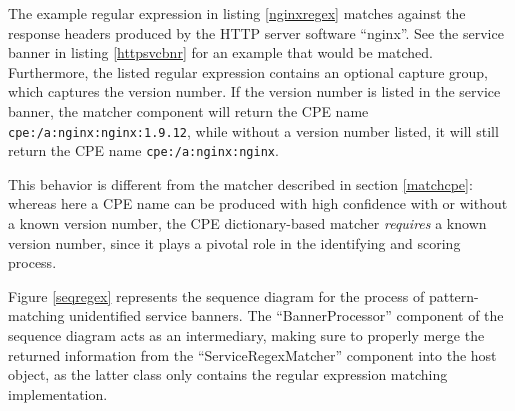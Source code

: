 \documentclass[a4paper,12pt]{article}
\begin{document}
	The example regular expression in listing \ref{nginxregex} matches against the response headers produced by the HTTP server software ``nginx''. See the service banner in listing \ref{httpsvcbnr} for an example that would be matched. Furthermore, the listed regular expression contains an optional capture group, which captures the version number. If the version number is listed in the service banner, the matcher component will return the CPE name \texttt{cpe:/a:nginx:nginx:1.9.12}, while without a version number listed, it will still return the CPE name \texttt{cpe:/a:nginx:nginx}.
	
	This behavior is different from the matcher described in section \ref{matchcpe}: whereas here a CPE name can be produced with high confidence with or without a known version number, the CPE dictionary-based matcher \textit{requires} a known version number, since it plays a pivotal role in the identifying and scoring process.
	
	Figure \ref{seqregex} represents the sequence diagram for the process of pattern-matching unidentified service banners. The ``BannerProcessor'' component of the sequence diagram acts as an intermediary, making sure to properly merge the returned information from the ``ServiceRegexMatcher'' component into the host object, as the latter class only contains the regular expression matching implementation.
		
\end{document}
